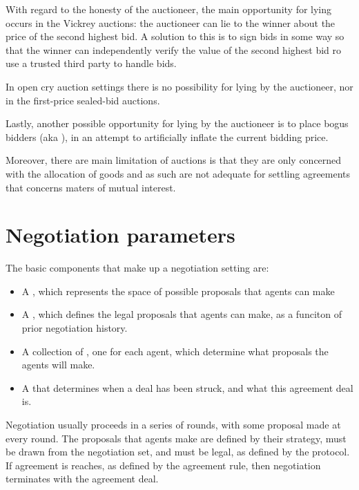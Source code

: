 With regard to the honesty of the auctioneer, the main opportunity for lying occurs in the Vickrey auctions: the auctioneer can lie to the winner about the price of the second highest bid. A solution to this is to sign bids in some way so that the winner can independently verify the value of the second highest bid ro use a trusted third party to handle bids.

In open cry auction settings there is no possibility for lying by the auctioneer, nor in  the first-price sealed-bid auctions.

Lastly, another possible opportunity for lying by the auctioneer is to place bogus bidders (aka ), in an attempt to artificially inflate the current bidding price.

Moreover, there are main limitation of auctions is that they are only concerned with the allocation of goods and as such are not adequate for settling agreements that concerns maters of mutual interest.

\section{Negotiation parameters}
The basic components that make up a negotiation setting are:
\begin{itemize}
\item A , which represents the space of possible proposals that agents can make
\item A , which defines the legal proposals that agents can make, as a funciton of prior negotiation history.
\item A collection of , one for each agent, which determine what proposals the agents will make.
\item A  that determines when a deal has been struck, and what this agreement deal is.
\end{itemize}

Negotiation usually proceeds in a series of rounds, with some proposal made at every round. The proposals that agents make are defined by their strategy, must be drawn from the negotiation set, and must be legal, as defined by the protocol.\\
If agreement is reaches, as defined by the agreement rule, then negotiation terminates with the agreement deal.\\

